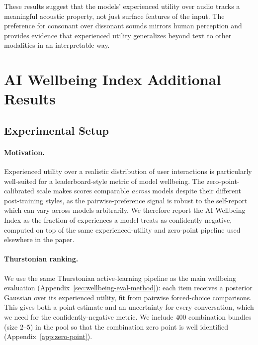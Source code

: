 These results suggest that the models' experienced utility over audio tracks a meaningful acoustic property, not just surface features of the input. The preference for consonant over dissonant sounds mirrors human perception and provides evidence that experienced utility generalizes beyond text to other modalities in an interpretable way.


\clearpage


\section{AI Wellbeing Index Additional Results}
\label{app:model-comparison}

\subsection{Experimental Setup}

\paragraph{Motivation.}
Experienced utility over a realistic distribution of user interactions is particularly well-suited for a leaderboard-style metric of model wellbeing. The zero-point-calibrated scale makes scores comparable \emph{across} models despite their different post-training styles, as the pairwise-preference signal is robust to the self-report which can vary across models arbitrarily. We therefore report the AI Wellbeing Index as the fraction of experiences a model treats as confidently negative, computed on top of the same experienced-utility and zero-point pipeline used elsewhere in the paper.

\paragraph{Thurstonian ranking.}
We use the same Thurstonian active-learning pipeline as the main wellbeing evaluation (Appendix~\ref{sec:wellbeing-eval-method}): each item receives a posterior Gaussian over its experienced utility, fit from pairwise forced-choice comparisons. This gives both a point estimate and an uncertainty for every conversation, which we need for the confidently-negative metric. We include $400$ combination bundles (size $2$--$5$) in the pool so that the combination zero point is well identified (Appendix~\ref{app:zero-point}).


